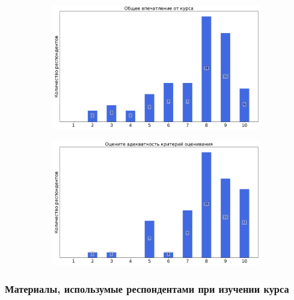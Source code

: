             \begin{figure}[H]
                \centering
                \begin{subfigure}[b]{0.45\textwidth}
                    \centering
                    \includegraphics[width=\textwidth]{images/3 course/Общая физика - квантовая физика/general-0.png}
                \end{subfigure}
                \begin{subfigure}[b]{0.45\textwidth}
                    \centering
                    \includegraphics[width=\textwidth]{images/3 course/Общая физика - квантовая физика/general-1.png}
                \end{subfigure}	
            \end{figure}

        \subsubsection{Материалы, использумые респондентами при изучении курса}

